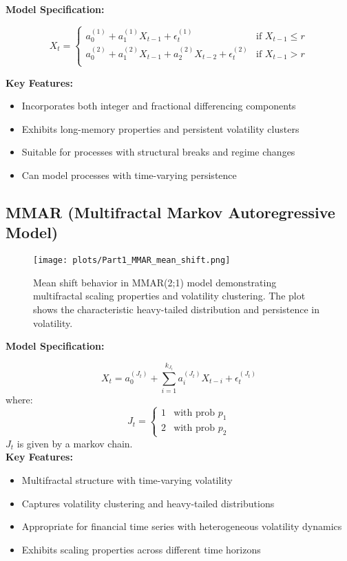 \documentclass{article}
\begin{document}
\textbf{Model Specification:}

\[
X_t = 
\begin{cases}
a_0^{(1)} + a_1^{(1)}X_{t-1} + \epsilon_t^{(1)} &\text{if } X_{t-1} \leq r \\
a_0^{(2)} + a_1^{(2)}X_{t-1} + a_2^{(2)}X_{t-2} + \epsilon_t^{(2)} & \text{if } X_{t-1} > r \\
\end{cases}
\]

\textbf{Key Features:}
\begin{itemize}
\item Incorporates both integer and fractional differencing components
\item Exhibits long-memory properties and persistent volatility clusters
\item Suitable for processes with structural breaks and regime changes
\item Can model processes with time-varying persistence
\end{itemize}

\subsection{MMAR (Multifractal Markov Autoregressive Model)}
\begin{figure}[H]
\centering
\texttt{[image: plots/Part1\_MMAR\_mean\_shift.png]}
\caption{Mean shift behavior in MMAR(2;1) model demonstrating multifractal scaling properties and volatility clustering. The plot shows the characteristic heavy-tailed distribution and persistence in volatility.}
\label{fig:mmar_mean_shift}
\end{figure}

\textbf{Model Specification:}

\[
X_t = a_0^{(J_t)} + \sum_{i=1}^{k_{J_t}} a_i^{(J_t)}X_{t-i} + \epsilon_t^{(J_t)}
\]
where: \\
\[
J_t =
\begin{cases}
    1 & \text{with prob } p_1 \\
    2 & \text{with prob } p_2
\end{cases}
\]
$J_t$ is given by a markov chain.
\\

\textbf{Key Features:}
\begin{itemize}
\item Multifractal structure with time-varying volatility
\item Captures volatility clustering and heavy-tailed distributions
\item Appropriate for financial time series with heterogeneous volatility dynamics
\item Exhibits scaling properties across different time horizons
\end{itemize}
\end{document}
